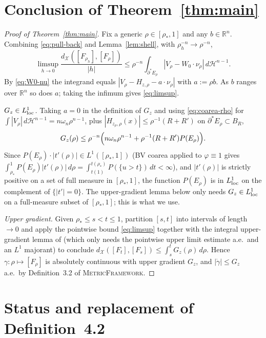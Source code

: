 \documentclass[11pt]{article}
\theoremstyle{definition}
\newcommand{\R}{\mathbb{R}}
\newcommand{\rstar}{\rho_{*}}
\newcommand{\X}{\mathcal X}
\newcommand{\Hn}{\mathcal H^{n-1}}
\begin{document}
\section{Conclusion of Theorem~\ref{thm:main}}\label{sec:conclude}

\begin{proof}[Proof of Theorem~\ref{thm:main}]
Fix a generic $\rho\in[\rstar,1]$ and any $b\in\R^n$. Combining
\eqref{eq:pull-back} and Lemma~\ref{lem:shell}, with $\rho_h^{-n}\to\rho^{-n}$,
\[
   \limsup_{h\to0}\frac{d_\X([F_{\rho_h}],[F_\rho])}{|h|}
   \le \rho^{-n}\int_{\partial^*E_\rho}|V_\rho-W_0\cdot\nu_\rho|\,d\Hn .
\]
By \eqref{eq:W0-nu} the integrand equals $|V_\rho-H_{z,\rho}-a\cdot\nu_\rho|$
with $a:=\rho b$. As $b$ ranges over $\R^n$ so does $a$; taking the
infimum gives \eqref{eq:limsup}.

\smallskip
\emph{$G_z\in L^1_{\rm loc}$.}
Taking $a=0$ in the definition of $G_z$ and using
\eqref{eq:coarea-rho} for $\int|V_\rho|\,d\Hn=n\omega_n\rho^{n-1}$, plus
$|H_{z_\rho,\rho}(x)|\le\rho^{-1}(R+R')$ on $\partial^*E_\rho\subset B_R$,
\begin{equation}\label{eq:G-L1-bound}
   G_z(\rho)\le\rho^{-n}\Bigl(n\omega_n\rho^{n-1}+\rho^{-1}(R+R')P(E_\rho)\Bigr).
\end{equation}
Since $P(E_\rho)\cdot|t'(\rho)|\in L^1([\rstar,1])$ (BV coarea applied to
$\varphi\equiv 1$ gives $\int_{\rstar}^1 P(E_\rho)|t'(\rho)|\,d\rho=
\int_{t(1)}^{t(\rstar)}P(\{u>t\})\,dt<\infty$), and $|t'(\rho)|$ is
strictly positive on a set of full measure in $[\rstar,1]$, the function
$P(E_\rho)$ is in $L^1_{\rm loc}$ on the complement of $\{|t'|=0\}$. The
upper-gradient lemma below only needs $G_z\in L^1_{\rm loc}$ on a
full-measure subset of $[\rstar,1]$; this is what we use.

\smallskip
\emph{Upper gradient.} Given $\rstar\le s<t\le 1$, partition
$[s,t]$ into intervals of length $\to 0$ and apply the pointwise bound
\eqref{eq:limsup} together with the integral upper-gradient lemma of
\cite[Lem.~1.1.4]{AGS2008} (which only needs the pointwise upper limit
estimate a.e.\ and an $L^1$ majorant) to conclude
$d_\X([F_t],[F_s])\le\int_s^t G_z(\rho)\,d\rho$. Hence $\gamma:\rho\mapsto
[F_\rho]$ is absolutely continuous with upper gradient $G_z$, and
$|\dot\gamma|\le G_z$ a.e.\ by Definition~3.2 of \textsc{MetricFramework}.
\end{proof}

\section{Status and replacement of Definition~4.2}\label{sec:status}
\end{document}
